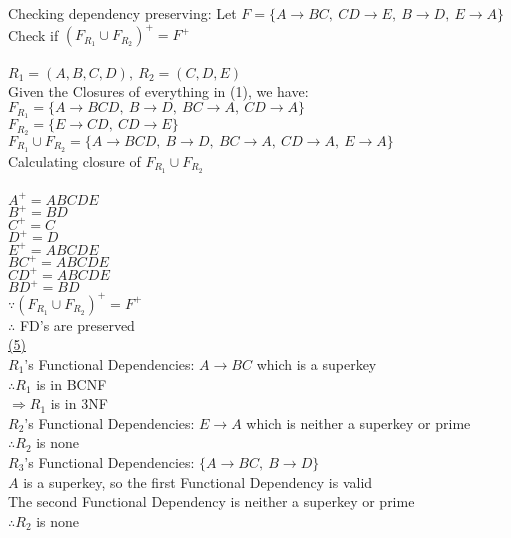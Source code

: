 \documentclass[12pt]{article}
\begin{document}
Checking dependency preserving: Let $F=\{A\rightarrow BC,\ CD \rightarrow E,\ B \rightarrow D,\ E \rightarrow A\}$
Check if $(F_{R_1} \cup F_{R_2})^+ = F^+$\\\\

$R_1 = (A, B, C, D),\ R_2 = (C, D, E)$\\

Given the Closures of everything in (1), we have:\\
$F_{R_1} = \{A \rightarrow BCD,\ B \rightarrow D,\ BC \rightarrow A,\ CD \rightarrow A\}$\\
$F_{R_2} = \{E \rightarrow CD,\ CD \rightarrow E\}$\\

$F_{R_1} \cup F_{R_2} = \{A \rightarrow BCD,\ B \rightarrow D,\ BC \rightarrow A,\ CD \rightarrow A,\ E \rightarrow A\}$\\

Calculating closure of $F_{R_1} \cup F_{R_2}$\\\\

$A^+ =ABCDE$\\
${B}^+=BD$\\
${C}^+=C$\\
${D}^+=D$\\
${E}^+=ABCDE$\\
${BC}^+= ABCDE$\\
${CD}^+= ABCDE$\\
${BD}^+=BD$\\

$\because (F_{R_1} \cup F_{R_2})^+ = F^+$\\
$\therefore$ FD's are preserved\\

\noindent \hyperlink{toc}{\hypertarget{6.5}{(5)}}\\
$R_1$'s Functional Dependencies: $A\rightarrow BC$ which is a superkey\\
$\therefore R_1$ is in BCNF\\
$\Longrightarrow R_1$ is in 3NF\\

$R_2$'s Functional Dependencies: $E\rightarrow A$ which is neither a superkey or prime\\
$\therefore R_2$ is none\\

$R_3$'s Functional Dependencies: $\{A\rightarrow BC,\ B \rightarrow D \}$\\
$A$ is a superkey, so the first Functional Dependency is valid\\
The second Functional Dependency is neither a superkey or prime\\
$\therefore R_2$ is none\\
\end{document}
